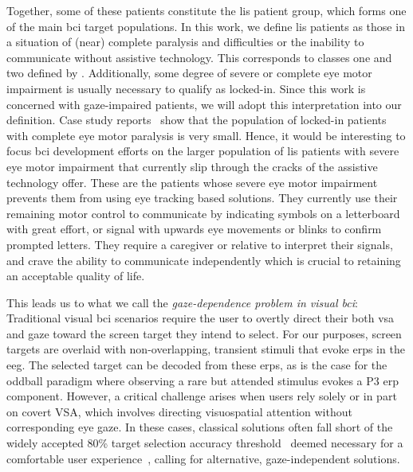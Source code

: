 Together, some of these patients constitute the \ac{lis} patient group, which
forms one of the main \ac{bci} target populations.
In this work, we define \ac{lis} patients as those in a situation of (near)
complete paralysis and difficulties or the inability to communicate without
assistive technology.
This corresponds to classes one and two defined by
\textcite{Wolpaw2006}\fnwolpawcrit.
Additionally, some degree of severe or complete eye motor impairment is usually
necessary to qualify as locked-in\fnlis.
Since this work is concerned with gaze-impaired patients, we will adopt this
interpretation into our definition.
Case study reports~\cite{Patterson1986} show that the population of locked-in
patients with complete eye motor paralysis is very small.
Hence, it would be interesting to focus \ac{bci} development efforts on the
larger population of \ac{lis} patients with severe eye motor impairment that
currently slip through the cracks of the assistive technology offer.
These are the patients whose severe eye motor impairment prevents them from
using eye tracking based solutions.
They currently use their remaining motor control to
communicate by indicating symbols on a letterboard with great effort,
or signal with upwards eye movements or blinks to confirm prompted letters.
They require a caregiver or relative to interpret their signals, and crave
the ability to communicate independently which is crucial to retaining an
acceptable quality of life.

This leads us to what we call the \emph{gaze-dependence problem in visual
\ac{bci}}:
Traditional visual \ac{bci} scenarios require the user to overtly direct their both
\ac{vsa} and gaze toward the screen target they intend to select.
For our purposes, screen targets are overlaid with non-overlapping, transient
stimuli that evoke \acp{erp} in the \ac{eeg}.
The selected target can be decoded from these \acp{erp}, as is the case for the
oddball paradigm where observing a rare but attended stimulus evokes a P3 \ac{erp}
component.
However, a critical challenge arises when users rely solely or in part on covert
VSA, which involves directing visuospatial attention without corresponding eye gaze.
In these cases, classical solutions often fall short of the widely accepted
80\% target selection accuracy threshold~\cite{Brunner2010,Frenzel2011,Treder2010,RonAngevin2019} deemed necessary for a comfortable user experience~\cite{Neeling2019}, calling for alternative, gaze-independent
solutions.

